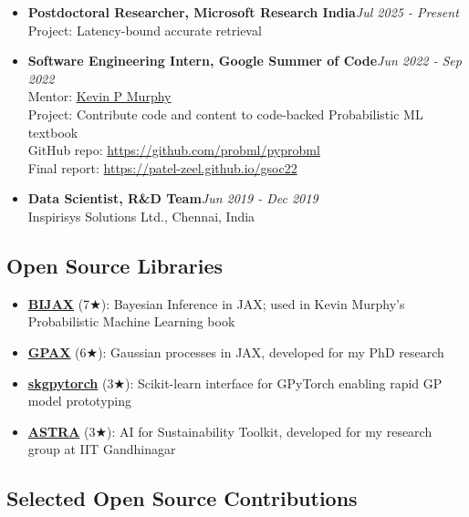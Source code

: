 \documentclass[letter,10pt]{article}
\begin{document}
\begin{itemize}
	\item \textbf{Postdoctoral Researcher, Microsoft Research India}\hfill \textit{Jul 2025 - Present}\\
	Project: Latency-bound accurate retrieval

	\item \textbf{Software Engineering Intern, Google Summer of Code}\hfill \textit{Jun 2022 - Sep 2022}\\
	Mentor: \href{https://www.cs.ubc.ca/~murphyk/}{Kevin P Murphy}\\
	Project: Contribute code and content to code-backed Probabilistic ML textbook\\
	GitHub repo: \href{https://github.com/probml/pyprobml}{https://github.com/probml/pyprobml}\\
	Final report: \href{https://patel-zeel.github.io/gsoc22}{https://patel-zeel.github.io/gsoc22}

	\item \textbf{Data Scientist, R\&D Team}\hfill \textit{Jun 2019 - Dec 2019}\\
	Inspirisys Solutions Ltd., Chennai, India
\end{itemize}

\subsection*{\sc \textbf{Open Source Libraries}\hspace{5pt}\noindent\hrulefill}

\begin{itemize}
	\item[] \href{https://github.com/patel-zeel/bijax}{\textbf{BIJAX}} (7$\bigstar$): Bayesian Inference in JAX; used in Kevin Murphy's Probabilistic Machine Learning book
	\item[] \href{https://github.com/patel-zeel/gpax}{\textbf{GPAX}} (6$\bigstar$): Gaussian processes in JAX, developed for my PhD research
	\item[] \href{https://github.com/patel-zeel/skgpytorch}{\textbf{skgpytorch}} (3$\bigstar$): Scikit-learn interface for GPyTorch enabling rapid GP model prototyping
	\item[] \href{https://github.com/sustainability-lab/ASTRA}{\textbf{ASTRA}} (3$\bigstar$): AI for Sustainability Toolkit, developed for my research group at IIT Gandhinagar
\end{itemize}

\subsection*{\sc \textbf{Selected Open Source Contributions}\hspace{5pt}\noindent\hrulefill}
\end{document}
